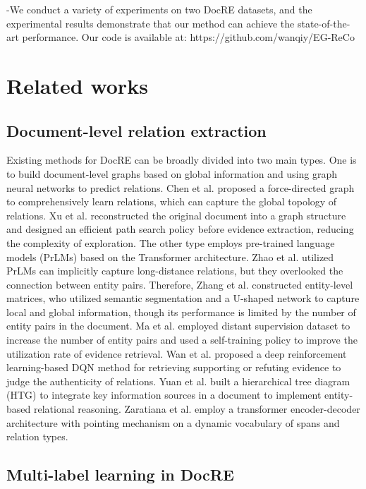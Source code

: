 \documentclass[preprint,12pt]{elsarticle}
\begin{document}
-We conduct a variety of experiments on two DocRE datasets, and the experimental results demonstrate that our method can achieve the state-of-the-art performance. Our code is available at: https://github.com/wanqiy/EG-ReCo
\section{Related works}
\subsection{Document-level relation extraction}\label{subsec2}

Existing methods for DocRE can be broadly divided into two main types. One is to build document-level graphs based on global information and using graph neural networks to predict relations.  Chen et al. \cite{10.1145/3520082} proposed a force-directed graph to comprehensively learn relations, which can capture the global topology of relations. Xu et al.\cite{10.1145/3511808.3557313} reconstructed the original document into a graph structure and designed an efficient path search policy before evidence extraction, reducing the complexity of exploration. The other type employs pre-trained language models (PrLMs) based on the Transformer architecture. Zhao et al.\cite{10.1145/3502223.3502245} utilized PrLMs can implicitly capture long-distance relations, but they overlooked the connection between entity pairs. Therefore, Zhang et al.\cite{ijcai2021p551} constructed entity-level matrices, who utilized semantic segmentation and a U-shaped network to capture local and global information, though its performance is limited by the number of entity pairs in the document. Ma et al.\cite{ma-etal-2023-dreeam} employed distant supervision dataset to increase the number of entity pairs and used a self-training policy to improve the utilization rate of evidence retrieval. Wan et al.\cite{wan-etal-2021-dqn} proposed a deep reinforcement learning-based DQN method for retrieving supporting or refuting evidence to judge the authenticity of relations. Yuan et al.\cite{10.1093/bioinformatics/btae418} built a hierarchical tree diagram (HTG) to integrate key information sources in a document to implement entity-based relational reasoning. Zaratiana et al.\cite{Zaratiana_Tomeh_Holat_Charnois_2024} employ a transformer encoder-decoder architecture with pointing mechanism on a dynamic vocabulary of spans and relation types.

\subsection{Multi-label learning in DocRE}\label{subsec3}
\end{document}

